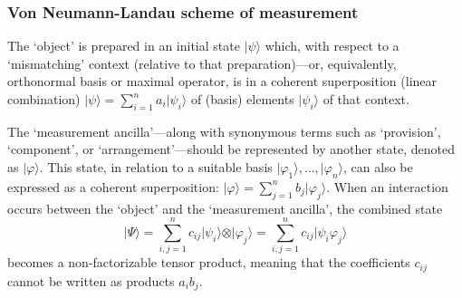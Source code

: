 \documentclass[amsmath,table,sans,amsfonts,hyperref={colorlinks,citecolor=blue,linkcolor=blue,urlcolor=purple}]{beamer}
\begin{document}
\begin{frame}[shrink=4]
 \frametitle{Von Neumann-Landau scheme of measurement}

The `object' is prepared in an initial state $\vert \psi \rangle$ which,
with respect to a `mismatching' context (relative to that preparation)---or,
 equivalently, orthonormal basis or maximal operator, is in a coherent superposition (linear combination)
$\vert \psi \rangle = \sum_{i=1}^n a_i \vert \psi_i \rangle$ of (basis) elements $\vert \psi_i\rangle$ of that context.

The `measurement ancilla'---along with synonymous terms such as `provision', `component', or `arrangement'---should be represented by another state,
denoted as $\vert \varphi \rangle$.
This state, in relation to a suitable basis ${\vert \varphi_1 \rangle, \ldots, \vert \varphi_n \rangle}$,
can also be expressed as a coherent superposition: $\vert \varphi \rangle = \sum_{j=1}^n b_j \vert \varphi_j \rangle$.
When an interaction occurs between the `object' and the `measurement ancilla',
the combined state
\begin{equation}
\vert \Psi \rangle = \sum_{i,j=1}^n c_{ij} \vert \psi_i \rangle \otimes \vert \varphi_j \rangle =
\sum_{i,j=1}^n c_{ij} \vert \psi_i \varphi_j \rangle
\label{2024-u-vNsiqm}
\end{equation}
becomes a non-factorizable tensor product, meaning that the coefficients $c_{ij}$
cannot be written as products $a_i b_j$.
\end{frame}
\end{document}
